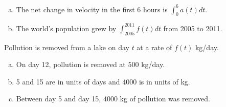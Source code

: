 \documentclass[11pt]{exam}
\begin{document}
\begin{questions}
    \begin{solution}
      \begin{enumerate}[(a)]
      \item The net change in velocity in the first \(6\) hours is
        \(\int_0^6 a(t) dt\).
      \item The world's population grew by \(\int_{2005}^{2011} f(t)
        dt\) from 2005 to 2011.
      \end{enumerate}
    \end{solution}
   \question Pollution is removed from a lake on day \(t\) at a rate
     of \(f(t)\) kg/day.
     \begin{solution}
       \begin{enumerate}[(a)]
       \item On day 12, pollution is removed at \(500\) kg/day.
       \item 5 and 15 are in units of days and 4000 is in units of kg.
       \item Between day 5 and day 15, \(4000\) kg of pollution was removed.
       \end{enumerate}
     \end{solution}
\question 
  \begin{multicols}{2}
    \begin{parts}

\end{parts}
\end{multicols}
\end{questions}
\end{document}
